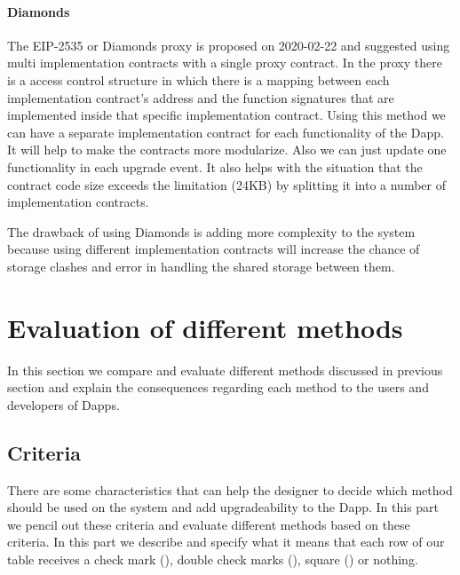 \paragraph{Diamonds}
The EIP-2535 or Diamonds proxy is proposed on 2020-02-22 and suggested using multi implementation contracts with a single proxy contract. In the proxy there is a access control structure in which there is a mapping between each implementation contract's address and the function signatures that are implemented inside that specific implementation contract. Using this method we can have a separate implementation contract for each functionality of the Dapp. It will help to make the contracts more modularize. Also we can just update one functionality in each upgrade event. It also helps with the situation that the contract code size exceeds the limitation (24KB) by splitting it into a number of implementation contracts.

The drawback of using Diamonds is adding more complexity to the system because using different implementation contracts will increase the chance of storage clashes and error in handling the shared storage between them.











 \section{Evaluation of different methods}
 In this section we compare and evaluate different methods discussed in previous section and explain the consequences regarding each method to the users and developers of Dapps.
 \subsection{Criteria}
 There are some characteristics that can help the designer to decide which method should be used on the system and add upgradeability to the Dapp. In this part we pencil out these criteria and evaluate different methods based on these criteria. In this part we describe and specify what it means that each row of our table receives a check mark (\checkmark), double check marks (\checkmark\checkmark), square (\XBox) or nothing. 
 
